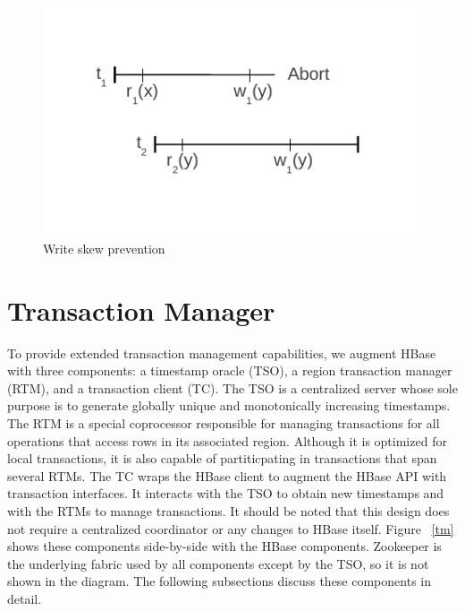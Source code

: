 \documentclass[10pt,final,journal]{IEEEtran}
\begin{document}
\begin{figure}[!t]
\centering
\hspace*{-.2in}
\includegraphics{images/si.pdf}
\caption{Write skew prevention}
\label{si}
\end{figure}

\section{Transaction Manager}
To provide extended transaction management capabilities, we augment HBase with three components: a timestamp oracle (TSO), a region transaction manager (RTM), and a transaction client (TC). The TSO is a centralized server whose sole purpose is to generate globally unique and monotonically increasing timestamps. The RTM is a special coprocessor responsible for managing transactions for all operations that access rows in its associated region. Although it is optimized for local transactions, it is also capable of partiticpating in transactions that span several RTMs. The TC wraps the HBase client to augment the HBase API with transaction interfaces. It interacts with the TSO to obtain new timestamps and with the RTMs to manage transactions. It should be noted that this design does not require a centralized coordinator or any changes to HBase itself. Figure ~\ref{tm} shows these components side-by-side with the HBase components. Zookeeper is the underlying fabric used by all components except by the TSO, so it is not shown in the diagram. The following subsections discuss these components in detail.
\end{document}
